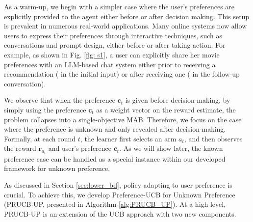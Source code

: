 As a warm-up, we begin with a simpler case where the user's preferences are explicitly provided to the agent either before or after decision making. 
This setup is prevalent in numerous real-world applications. 
Many online systems now allow users to express their preferences through interactive techniques, such as conversations and prompt design, either before or after taking action. For example, as shown in Fig. \ref{fig: s1}, a user can explicitly share her movie preferences with an LLM-based chat system either prior to receiving a recommendation (\textsf{} in the initial input) or after receiving one (\textsf{} in the follow-up conversation).

We observe that when the preference $\boldsymbol{c}_t$ is given before decision-making, by simply using the preference $\boldsymbol{c}_t$ as a weight vector on the reward estimate, the 
problem collapses into a single-objective MAB. 
Therefore, we focus on the case where the preference is unknown and only revealed after decision-making. 
Formally, at each round $t$, the learner first selects an arm $a_t$, and then observes the reward $\boldsymbol{r}_{a_t}$ and user's preference $\boldsymbol{c}_t$.
As we will show later, the known preference case can be handled as a special instance within our developed framework for unknown preference.

As discussed in Section \ref{sec:lower_bd}, policy adapting to user preference is crucial. 
To achieve this, we develop Preference-UCB for Unknown Preference (PRUCB-UP, presented in Algorithm \ref{alg:PRUCB_UP}). 
At a high level, PRUCB-UP is an extension of the UCB approach \cite{auer2002finite} with two new components.


